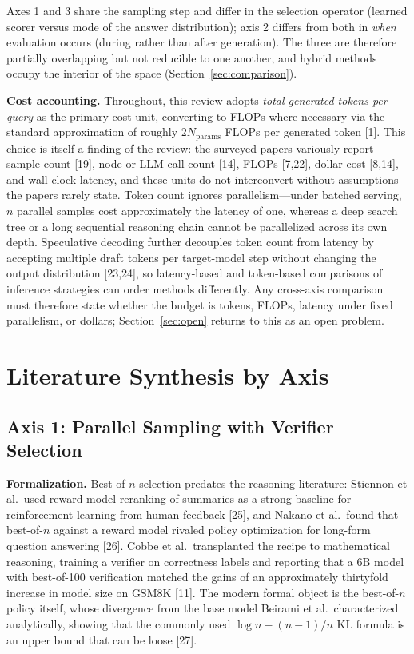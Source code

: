 \documentclass[10pt]{article}
\begin{document}
Axes 1 and 3 share the sampling step and differ in the selection operator (learned scorer versus mode of the answer distribution); axis 2 differs from both in \emph{when} evaluation occurs (during rather than after generation). The three are therefore partially overlapping but not reducible to one another, and hybrid methods occupy the interior of the space (Section~\ref{sec:comparison}).

\textbf{Cost accounting.} Throughout, this review adopts \emph{total generated tokens per query} as the primary cost unit, converting to FLOPs where necessary via the standard approximation of roughly $2N_{\text{params}}$ FLOPs per generated token [1]. This choice is itself a finding of the review: the surveyed papers variously report sample count [19], node or LLM-call count [14], FLOPs [7,22], dollar cost [8,14], and wall-clock latency, and these units do not interconvert without assumptions the papers rarely state. Token count ignores parallelism---under batched serving, $n$ parallel samples cost approximately the latency of one, whereas a deep search tree or a long sequential reasoning chain cannot be parallelized across its own depth. Speculative decoding further decouples token count from latency by accepting multiple draft tokens per target-model step without changing the output distribution [23,24], so latency-based and token-based comparisons of inference strategies can order methods differently. Any cross-axis comparison must therefore state whether the budget is tokens, FLOPs, latency under fixed parallelism, or dollars; Section~\ref{sec:open} returns to this as an open problem.

\section{Literature Synthesis by Axis}
\label{sec:synthesis}

\subsection{Axis 1: Parallel Sampling with Verifier Selection}
\label{sec:axis1}

\textbf{Formalization.} Best-of-$n$ selection predates the reasoning literature: Stiennon et al.\ used reward-model reranking of summaries as a strong baseline for reinforcement learning from human feedback [25], and Nakano et al.\ found that best-of-$n$ against a reward model rivaled policy optimization for long-form question answering [26]. Cobbe et al.\ transplanted the recipe to mathematical reasoning, training a verifier on correctness labels and reporting that a 6B model with best-of-100 verification matched the gains of an approximately thirtyfold increase in model size on GSM8K [11]. The modern formal object is the best-of-$n$ policy itself, whose divergence from the base model Beirami et al.\ characterized analytically, showing that the commonly used $\log n - (n-1)/n$ KL formula is an upper bound that can be loose [27].
\end{document}
